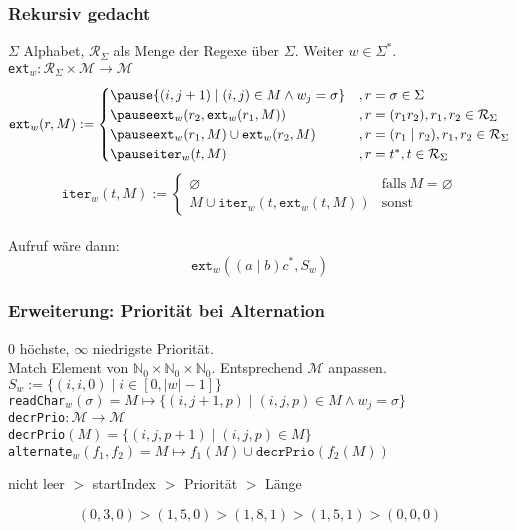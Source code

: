 \documentclass{beamer}
\begin{document}
    \begin{frame}[t]
        \frametitle{Rekursiv gedacht}
        {\small
            $\Sigma$ Alphabet, $\mathcal{R}_\Sigma$ als Menge der Regexe über $\Sigma$. Weiter $w \in \Sigma^*$.} \\[5pt]
        {\small
            \texttt{ext}$_w : \mathcal{R}_\Sigma \times \mathcal{M} \to \mathcal{M}$
            $$
                \texttt{ext}_w(r, M) := \begin{cases}
                    \pause\{(i, j+1) \mid (i,j) \in M \land w_j = \sigma\}
                        &, r = \sigma \in \Sigma\\
                    \pause\texttt{ext}_w(r_2, \texttt{ext}_w(r_1, M))
                        &, r = (r_1r_2), r_1,r_2 \in \mathcal{R}_\Sigma\\
                    \pause\texttt{ext}_w(r_1, M) \cup \texttt{ext}_w(r_2,M)
                        &, r = (r_1 \mid r_2),r_1,r_2 \in \mathcal{R}_\Sigma\\
                    \pause\texttt{iter}_w(t, M)
                        &, r = t^*,t \in \mathcal{R}_\Sigma
                \end{cases}
            $$$$
            \texttt{iter}_w(t, M) := \begin{cases}
                    \varnothing & \text{falls}\ M = \varnothing\\
                    M \cup \texttt{iter}_w(t, \texttt{ext}_w(t, M)) & \text{sonst}
                \end{cases}
            $$\\[5pt]
            \pause
            Aufruf wäre dann:
            $$
                \texttt{ext}_w((a\mid b)c^*, S_w)
            $$
        }
    \end{frame}

    \begin{frame}[t]
        \frametitle{Erweiterung: Priorität bei Alternation}
        0 höchste, $\infty$ niedrigste Priorität.\\[10pt]
        Match Element von $\mathbb{N}_0 \times \mathbb{N}_0 \times \mathbb{N}_0$.
        Entsprechend $\mathcal{M}$ anpassen.\\[5pt]
        $S_w := \{(i,i,0) \mid i \in [0, |w|-1]\}$\\[10pt]
        \pause
        \texttt{readChar}$_w(\sigma) = M \mapsto \{(i, j+1, p) \mid (i,j,p) \in M \land w_j = \sigma\}$\\[10pt]
        \pause
        \texttt{decrPrio}$ : \mathcal{M} \to \mathcal{M}$\\
        \texttt{decrPrio}$(M) = \{(i,j,p+1) \mid (i,j,p) \in M\}$\\[10pt]
        \pause
        \texttt{alternate}$_w(f_1,f_2) = M \mapsto f_1(M) \cup \texttt{decrPrio}(f_2(M))$\\[10pt]
        \pause
        \begin{center}
            nicht leer $>$ startIndex $>$ Priorität $>$ Länge
        \end{center}
        $$
            (0,3,0) > (1,5,0) > (1,8,1) > (1,5,1) > (0,0,0)
        $$
    \end{frame}
\end{document}
